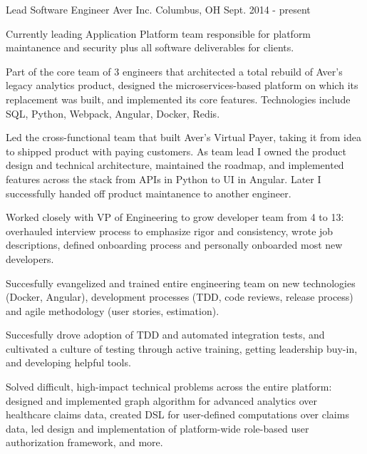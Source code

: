 

\begin{cventries}

  \cventry
    {Lead Software Engineer} %
    {Aver Inc.} %
    {Columbus, OH} %
    {Sept. 2014 - present} %
    {
      \begin{cvitems} %
        \item {Currently leading Application Platform team responsible for platform maintanence and security plus all software deliverables for clients.}
        \item {Part of the core team of 3 engineers that architected a total rebuild of Aver's legacy analytics product, designed the microservices-based platform on which its replacement was built, and implemented its core features. Technologies include SQL, Python, Webpack, Angular, Docker, Redis.}
        \item {Led the cross-functional team that built Aver's Virtual Payer, taking it from idea to shipped product with paying customers. As team lead I owned the product design and technical architecture, maintained the roadmap, and implemented features across the stack from APIs in Python to UI in Angular. Later I successfully handed off product maintanence to another engineer.}
        \item {Worked closely with VP of Engineering to grow developer team from 4 to 13: overhauled interview process to emphasize rigor and consistency, wrote job descriptions, defined onboarding process and personally onboarded most new developers.}
        \item {Succesfully evangelized and trained entire engineering team on new technologies (Docker, Angular), development processes (TDD, code reviews, release process) and agile methodology (user stories, estimation). }
        \item {Succesfully drove adoption of TDD and automated integration tests, and cultivated a culture of testing through active training, getting leadership buy-in, and developing helpful tools. }
        \item {Solved difficult, high-impact technical problems across the entire platform: designed and implemented graph algorithm for advanced analytics over healthcare claims data, created DSL for user-defined computations over claims data, led design and implementation of platform-wide role-based user authorization framework, and more.}
      \end{cvitems}
    }


\end{cventries}
